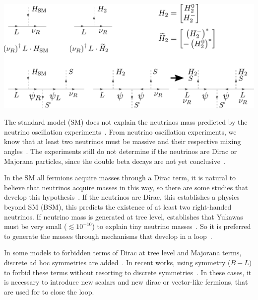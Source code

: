 \documentclass[12pt]{article}
\begin{document}
\includegraphics[scale=0.4]{tl}





The standard model (SM) does not explain the neutrinos mass predicted by the neutrino oscillation experiments~\cite{Ahmad:2002jz, Fukuda:1998mi}. From neutrino oscillation experiments, we know that at least two neutrinos must be massive and their respective mixing angles~\cite{deSalas:2017kay}. The experiments still do not determine if the neutrinos are Dirac or Majorana particles, since the double beta decays are not yet conclusive~\cite{Arnold:2016bed, Albert:2017owj, Alduino:2017ehq, Aalseth:2017btx, Agostini:2018tnm, KamLAND-Zen:2016pfg}.

In the SM all fermions acquire masses through a Dirac term, it is natural to believe that neutrinos acquire masses in this way, so there are some studies that develop this hypothesis~\cite{Branco:1978bz}. If the neutrinos are  Dirac, this establishes a physics beyond SM (BSM), this predicts the existence of at least two right-handed neutrinos. If neutrino mass is generated at tree level, establishes that Yukawas must be very small ($\lesssim 10^{-10}$) to explain tiny neutrino masses~\cite{deSalas:2017kay}. So it is preferred to generate the masses through mechanisms that develop in a loop~\cite{Branco:1978bz, Zee:1980ai, Ma:2006km}.

In some models to forbidden terms of Dirac at tree level and Majorana terms, discrete ad hoc symmetries are added~\cite{Han:2018zcn, Wang:2017mcy}. In recent works, using symmetry ($B-L$) to forbid these terms without resorting to discrete symmetries~\cite{Calle:2018ovc, Bonilla:2018ynb, Saad:2019bqf}. In these cases, it is necessary to introduce new scalars and new dirac or vector-like fermions, that are used for to close the loop.
\end{document}

